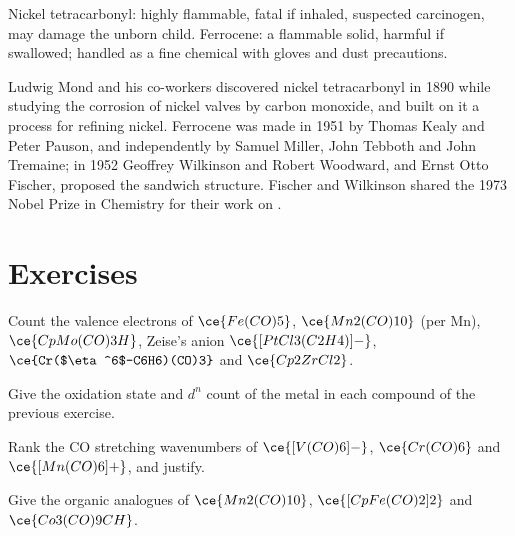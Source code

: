 \begin{safety}{}
Nickel tetracarbonyl: highly flammable, fatal if inhaled, suspected carcinogen,
may damage the unborn child. Ferrocene: a flammable solid, harmful if swallowed;
handled as a fine chemical with gloves and dust precautions.
\end{safety}

\begin{history}
Ludwig Mond and his co-workers discovered nickel tetracarbonyl in 1890 while
studying the corrosion of nickel valves by carbon monoxide, and built on it a
process for refining nickel. Ferrocene was made in 1951 by Thomas Kealy and Peter
Pauson, and independently by Samuel Miller, John Tebboth and John Tremaine; in 1952
Geoffrey Wilkinson and Robert Woodward, and Ernst Otto Fischer, proposed the
sandwich structure. Fischer and Wilkinson shared the 1973 Nobel Prize in
Chemistry for their work on .
\end{history}

\section{Exercises}

\begin{exercise}[$\star$]\label{exo:b3:organometallic-bonding:1}
Count the valence electrons of $\ce{Fe(CO)5}$, $\ce{Mn2(CO)10}$ (per Mn), $\ce{CpMo(CO)3H}$, Zeise's anion
$\ce{[PtCl3(C2H4)]-}$, $\ce{Cr($\eta^6$-C6H6)(CO)3}$ and $\ce{Cp2ZrCl2}$.
\end{exercise}

\begin{exercise}[$\star$]\label{exo:b3:organometallic-bonding:2}
Give the oxidation state and $d^n$ count of the metal in each compound of the
previous exercise.
\end{exercise}

\begin{exercise}[$\star$]\label{exo:b3:organometallic-bonding:3}
Rank the CO stretching wavenumbers of $\ce{[V(CO)6]-}$, $\ce{Cr(CO)6}$ and $\ce{[Mn(CO)6]+}$, and justify.
\end{exercise}

\begin{exercise}[$\star$]\label{exo:b3:organometallic-bonding:4}
Give the organic  analogues of $\ce{Mn2(CO)10}$, $\ce{[CpFe(CO)2]2}$ and $\ce{Co3(CO)9CH}$.
\end{exercise}

